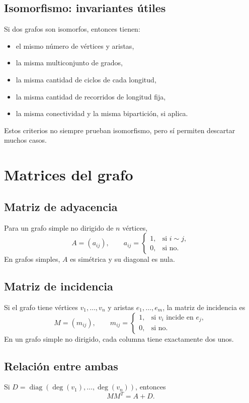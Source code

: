 \documentclass[11pt,a4paper]{article}
\begin{document}
\subsection*{Isomorfismo: invariantes útiles}
Si dos grafos son isomorfos, entonces tienen:
\begin{itemize}
    \item el mismo número de vértices y aristas,
    \item la misma multiconjunto de grados,
    \item la misma cantidad de ciclos de cada longitud,
    \item la misma cantidad de recorridos de longitud fija,
    \item la misma conectividad y la misma bipartición, si aplica.
\end{itemize}
Estos criterios no siempre prueban isomorfismo, pero sí permiten descartar muchos casos.

\section{Matrices del grafo}

\subsection{Matriz de adyacencia}
Para un grafo simple no dirigido de $n$ vértices,
\[
A=(a_{ij}),\qquad a_{ij}=\begin{cases}
1,&\text{si } i\sim j,\\
0,&\text{si no.}
\end{cases}
\]
En grafos simples, $A$ es simétrica y su diagonal es nula.

\subsection{Matriz de incidencia}
Si el grafo tiene vértices $v_1,\dots,v_n$ y aristas $e_1,\dots,e_m$, la matriz de incidencia es
\[
M=(m_{ij}),\qquad m_{ij}=\begin{cases}
1,&\text{si } v_i \text{ incide en } e_j,\\
0,&\text{si no.}
\end{cases}
\]
En un grafo simple no dirigido, cada columna tiene exactamente dos unos.

\subsection{Relación entre ambas}
Si $D=\operatorname{diag}(\deg(v_1),\dots,\deg(v_n))$, entonces
\[
MM^T=A+D.
\]
\end{document}
